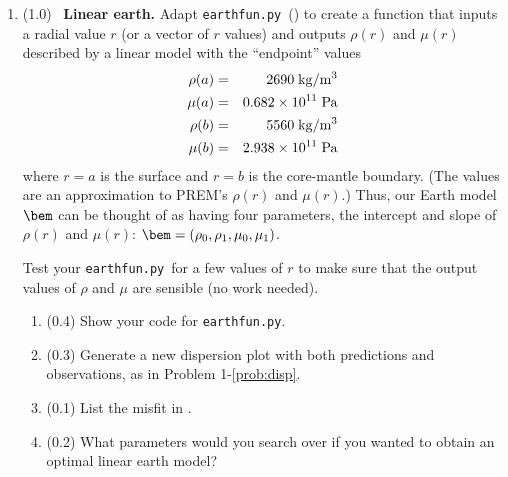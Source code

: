 \documentclass[11pt,titlepage,fleqn]{article}
\newcommand{\tfileD}{{\tt earthfun.py}}
\begin{document}
\begin{enumerate}
\label{prob:earth_homo}


\item (1.0) \ptag\ {\bf Linear earth.} Adapt \tfileD\ () to create a function that inputs a radial value $r$ (or a vector of $r$ values) and outputs $\rho(r)$ and $\mu(r)$ described by a linear model with the ``endpoint'' values
%
\begin{eqnarray*}
\rho(a) &=& 2690 \; {\rm kg/m^3}
\\
\mu(a) &=& 0.682 \times 10^{11} \; {\rm Pa}
\\
\rho(b) &=& 5560 \; {\rm kg/m^3}
\\
\mu(b) &=& 2.938 \times 10^{11} \; {\rm Pa}
\end{eqnarray*}
%
where $r=a$ is the surface and $r=b$ is the core-mantle boundary. (The values are an approximation to PREM's $\rho(r)$ and $\mu(r)$.) Thus, our Earth model $\bem$ can be thought of as having four parameters, the intercept and slope of $\rho(r)$ and $\mu(r)$: $\bem = (\rho_0,\rho_1,\mu_0,\mu_1)$.

Test your \tfileD\ for a few values of $r$ to make sure that the output values of $\rho$ and $\mu$ are sensible (no work needed).


\begin{enumerate}
\item (0.4) Show your code for \tfileD.
\item (0.3) Generate a new dispersion plot with both predictions and observations, as in Problem 1-\ref{prob:disp}.
\item (0.1) List the misfit in .
\item (0.2) What parameters would you search over if you wanted to obtain an optimal linear earth model?
\end{enumerate}

\label{prob:earth_linear}



\end{enumerate}
\end{document}
